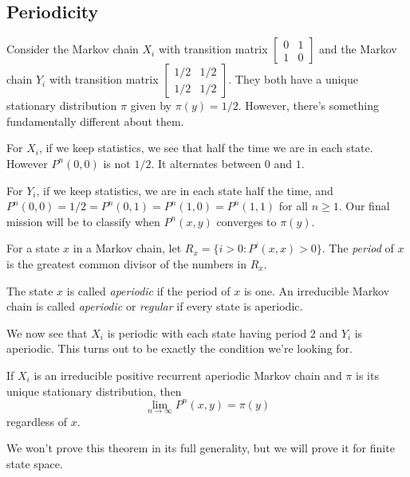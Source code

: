 \documentclass{problemset}
\newcommand{\mat}[1]{\begin{bmatrix}#1\end{bmatrix}}
\newcommand{\1}{\mathbf{1}}
\begin{document}
	\subsection*{Periodicity}

	Consider the Markov chain $X_i$ with transition matrix $\mat{0&1\\1&0}$ and the Markov
	chain $Y_i$ with transition matrix $\mat{1/2&1/2\\1/2&1/2}$.  They both have a unique stationary
	distribution $\pi$ given by $\pi(y)=1/2$.  However, there's something fundamentally different about them.

	For $X_i$, if we keep statistics, we see that half the time we are in each state.  However $P^n(0,0)$
	is not $1/2$.  It alternates between $0$ and $1$.

	For $Y_i$, if we keep statistics, we are in each state half the time, and $P^n(0,0)=1/2=P^n(0,1)=P^n(1,0)=P^n(1,1)$
	for all $n\geq 1$.  Our final mission will be to classify when $P^n(x,y)$ converges to $\pi(y)$.

	\begin{definition}[Period]
		For a state $x$ in a Markov chain, let $R_x=\{i>0: P^i(x,x)>0\}$.  The
		\emph{period} of $x$ is the greatest common divisor of the numbers in $R_x$.

		The state $x$ is called \emph{aperiodic} if the period of $x$ is one.  An
		irreducible Markov chain
		is called \emph{aperiodic} or \emph{regular} if every state is aperiodic.
	\end{definition}

	We now see that $X_i$ is periodic with each state having period $2$ and $Y_i$ is aperiodic.
	This turns out to be exactly the condition we're looking for.

	\begin{theorem}
		If $X_i$ is an irreducible positive recurrent aperiodic Markov chain and $\pi$ is its
		unique stationary distribution, then
		\[
			\lim_{n\to\infty} P^n(x,y)=\pi(y)
		\]
		regardless of $x$.
	\end{theorem}

	We won't prove this theorem in its full generality, but we will prove it for finite state space.
\end{document}
